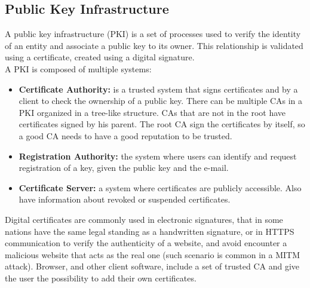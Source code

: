 \subsection{Public Key Infrastructure}
A public key infrastructure (PKI) is a set of processes used to verify the identity of an entity and associate a public key to its owner. This relationship is validated using a certificate, created using a digital signature.\\
A PKI is composed of multiple systems:
\begin{itemize}
    \item{\textbf{Certificate Authority:} is a trusted system that signs certificates and by a client to check the ownership of a public key. There can be multiple CAs in a PKI organized in a tree-like structure. CAs that are not in the root have certificates signed by his parent. The root CA sign the certificates by itself, so a good CA needs to have a good reputation to be trusted.}
    \item{\textbf{Registration Authority:} the system where users can identify and request registration of a key, given the public key and the e-mail.}
    \item{\textbf{Certificate Server:} a system where certificates are publicly accessible. Also have information about revoked or suspended certificates.}
\end{itemize}
Digital certificates are commonly used in electronic signatures, that in some nations have the same legal standing as a handwritten signature, or in HTTPS communication to verify the authenticity of a website, and avoid encounter a malicious website that acts as the real one (such scenario is common in a MITM attack). Browser, and other client software, include a set of trusted CA and give the user the possibility to add their own certificates.
